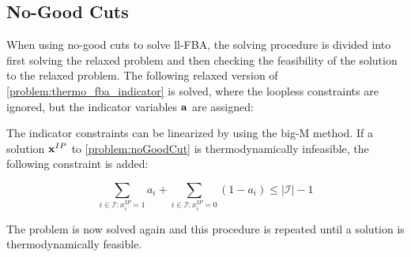 \subsection{No-Good Cuts} \label{section:no_good_cuts}
When using no-good cuts to solve ll-FBA, the solving procedure is divided into first solving the relaxed problem and then checking the feasibility of the solution to the relaxed problem. 
The following relaxed version of \cref{problem:thermo_fba_indicator} is solved, where the loopless constraints are ignored, but the indicator variables $\bold a$ are assigned:

The indicator constraints can be linearized by using the big-M method.
If a solution $\bold x^{IP}$ to \cref{problem:noGoodCut} is thermodynamically infeasible, the following constraint is added:

\begin{equation} \label{noGoodCut}
\sum_{i \in \mathcal{I}: x_i^{IP}=1} a_i + \sum_{i \in \mathcal{I}: x_i^{IP}=0} (1-a_i) \leq |\mathcal{I}|-1
\end{equation}

The problem is now solved again and this procedure is repeated until a solution is thermodynamically feasible. 

